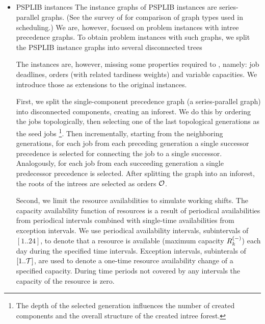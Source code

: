 \subsection*{}

\begin{itemize}
    \item PSPLIB instances
        The instance graphs of PSPLIB instances are series-parallel graphs.
        (See the survey of \citep{PROT2017} for comparison of graph types used in scheduling.)
        We are, however, focused on problem instances with intree precedence graphs.
        To obtain problem instances with such graphs,
        we split the PSPLIB instance graphs into several disconnected trees 

        The instances are, however, missing some properties required to ,
        namely: job deadlines, orders (with related tardiness weights) and variable capacities. We introduce
        those as extensions to the original instances.

        First, we split the single-component precedence graph (a series-parallel graph) into disconnected
        components, creating an inforest. We do this by ordering the jobs topologically, then selecting one
        of the last topological generations as the seed jobs%
            \footnote{The depth of the selected generation influences the number of created components and the
            overall structure of the created intree forest.}.
        Then incrementally, starting from the neighboring generations, for each job from each preceding generation
        a single successor precedence is selected for connecting the job to a single successor. Analogously,
        for each job from each succeeding generation a single predecessor precedence is selected.
        After splitting the graph into an inforest, the roots of the intrees are selected as orders $\mathcal{O}$.

        Second, we limit the resource availabilities to simulate working shifts. The capacity availability function
        of resources is a result of periodical availabilities from periodical intervals combined with single-time
        availabilities from exception intervals. We use periodical availability intervals, subintervals of $[1 .. 24]$,
        to denote that a resource is available (maximum capacity $\shiftcapacity{k}$) each day during the specified time
        intervals. Exception intervals, subinterals of $[1 .. \mathcal{T}]$, are used to denote a one-time resource
        availability change of a specified capacity. During time periods not covered by any intervals the capacity
        of the resource is zero.


\end{itemize}
